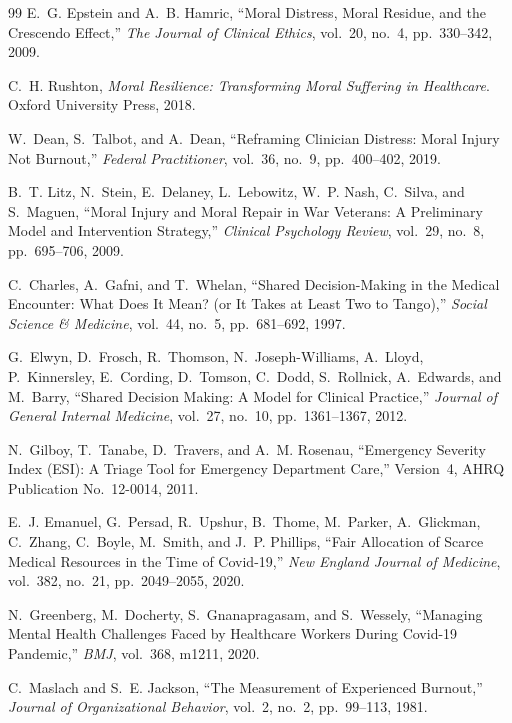 \documentclass[12pt]{article}
\theoremstyle{definition}
\theoremstyle{remark}
\begin{document}
\begin{thebibliography}{99}
E.~G. Epstein and A.~B. Hamric, ``Moral Distress, Moral Residue, and the Crescendo Effect,'' \emph{The Journal of Clinical Ethics}, vol.~20, no.~4, pp.~330--342, 2009.

C.~H. Rushton, \emph{Moral Resilience: Transforming Moral Suffering in Healthcare}.  Oxford University Press, 2018.

W.~Dean, S.~Talbot, and A.~Dean, ``Reframing Clinician Distress: Moral Injury Not Burnout,'' \emph{Federal Practitioner}, vol.~36, no.~9, pp.~400--402, 2019.

B.~T. Litz, N.~Stein, E.~Delaney, L.~Lebowitz, W.~P. Nash, C.~Silva, and S.~Maguen, ``Moral Injury and Moral Repair in War Veterans: A Preliminary Model and Intervention Strategy,'' \emph{Clinical Psychology Review}, vol.~29, no.~8, pp.~695--706, 2009.

C.~Charles, A.~Gafni, and T.~Whelan, ``Shared Decision-Making in the Medical Encounter: What Does It Mean? (or It Takes at Least Two to Tango),'' \emph{Social Science \& Medicine}, vol.~44, no.~5, pp.~681--692, 1997.

G.~Elwyn, D.~Frosch, R.~Thomson, N.~Joseph-Williams, A.~Lloyd, P.~Kinnersley, E.~Cording, D.~Tomson, C.~Dodd, S.~Rollnick, A.~Edwards, and M.~Barry, ``Shared Decision Making: A Model for Clinical Practice,'' \emph{Journal of General Internal Medicine}, vol.~27, no.~10, pp.~1361--1367, 2012.

N.~Gilboy, T.~Tanabe, D.~Travers, and A.~M. Rosenau, ``Emergency Severity Index (ESI): A Triage Tool for Emergency Department Care,'' Version~4, AHRQ Publication No.\ 12-0014, 2011.

E.~J. Emanuel, G.~Persad, R.~Upshur, B.~Thome, M.~Parker, A.~Glickman, C.~Zhang, C.~Boyle, M.~Smith, and J.~P. Phillips, ``Fair Allocation of Scarce Medical Resources in the Time of Covid-19,'' \emph{New England Journal of Medicine}, vol.~382, no.~21, pp.~2049--2055, 2020.

N.~Greenberg, M.~Docherty, S.~Gnanapragasam, and S.~Wessely, ``Managing Mental Health Challenges Faced by Healthcare Workers During Covid-19 Pandemic,'' \emph{BMJ}, vol.~368, m1211, 2020.

C.~Maslach and S.~E. Jackson, ``The Measurement of Experienced Burnout,'' \emph{Journal of Organizational Behavior}, vol.~2, no.~2, pp.~99--113, 1981.


\end{thebibliography}
\end{document}
